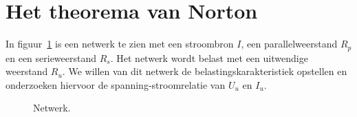 \section{Het theorema van Norton}

In figuur~\ref{fig:gelnetwerkvoornorton} is een netwerk te zien met een stroombron $I$, een
parallelweerstand $R_p$ en een serieweerstand $R_s$. Het netwerk wordt belast met een uitwendige
weerstand $R_u$. We willen van dit netwerk de belastingskarakteristiek opstellen en onderzoeken
hiervoor de spanning-stroomrelatie van $U_u$ en $I_u$.

\begin{figure}[!ht]
\centering
{}
\caption{Netwerk.}
\label{fig:gelnetwerkvoornorton}
\end{figure}

